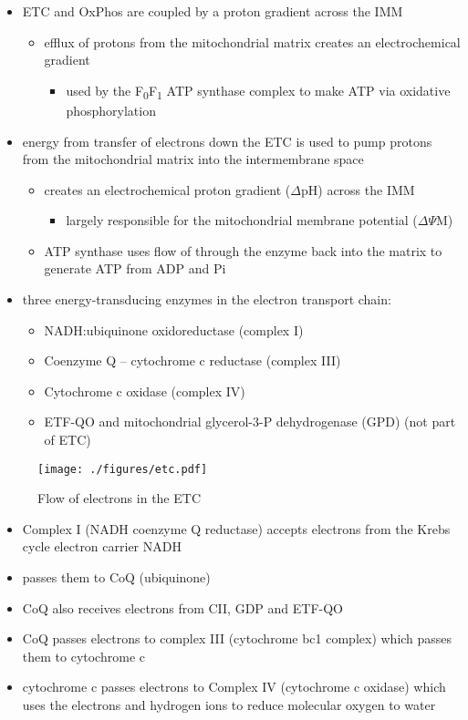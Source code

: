 \documentclass{scrartcl}
\begin{document}
\begin{itemize}
\item ETC and OxPhos are coupled by a proton gradient across the IMM
\begin{itemize}
\item efflux of protons from the mitochondrial matrix creates an
electrochemical gradient
\begin{itemize}
\item used by the F\textsubscript{0}F\textsubscript{1} ATP synthase complex to make ATP via oxidative phosphorylation
\end{itemize}
\end{itemize}
\item energy from transfer of electrons down the ETC is used to pump
protons from the mitochondrial matrix into the intermembrane space
\begin{itemize}
\item creates an electrochemical proton gradient (\(\Delta\)pH) across the IMM
\begin{itemize}
\item largely responsible for the mitochondrial membrane potential (\(\Delta \Psi\)M)
\end{itemize}
\item ATP synthase uses flow of  through the enzyme back into the
matrix to generate ATP from ADP and Pi
\end{itemize}
\item three energy-transducing enzymes in the electron transport chain:
\begin{itemize}
\item NADH:ubiquinone oxidoreductase (complex I)
\item Coenzyme Q – cytochrome c reductase (complex III)
\item Cytochrome c oxidase (complex IV)
\item ETF-QO and mitochondrial glycerol-3-P dehydrogenase (GPD) (not part of ETC)
\end{itemize}
\end{itemize}

\begin{figure}[htbp]
\centering
\texttt{[image: ./figures/etc.pdf]}
\caption{\label{fig:org588ed8a}Flow of electrons in the ETC}
\end{figure}

\begin{itemize}
\item Complex I (NADH coenzyme Q reductase) accepts electrons from the
Krebs cycle electron carrier NADH
\item passes them to CoQ (ubiquinone)
\item CoQ also receives electrons from CII, GDP and ETF-QO

\item CoQ passes electrons to complex III (cytochrome bc1 complex) which
passes them to cytochrome c
\item cytochrome c passes electrons to Complex IV (cytochrome c oxidase)
which uses the electrons and hydrogen ions to reduce molecular
oxygen to water
\end{itemize}
\end{document}
